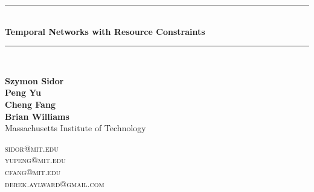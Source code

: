\documentclass{article}
\newcommand{\HRule}{\rule{\linewidth}{0.5mm}}
\begin{document}
\thispagestyle{empty}

\begin{center}
\HRule \\[0.3cm]
{\Large \bfseries
Temporal Networks with Resource Constraints\\[0.3cm]}
\HRule \\[0.5cm]

\noindent
\begin{minipage}{0.5\textwidth}
\begin{flushleft}
\textbf{Szymon Sidor\\
Peng Yu\\
Cheng Fang\\
Brian Williams}\\
Massachusetts Institute of Technology
\end{flushleft}
\end{minipage}%
\begin{minipage}{0.5\textwidth}
\begin{flushright}
\textsc{sidor@mit.edu}\\
\textsc{yupeng@mit.edu}\\
\textsc{cfang@mit.edu}\\
\textsc{derek.aylward@gmail.com}\\
$\ $
\end{flushright}
\end{minipage}
\\[1cm]
\end{center}
\pagestyle{fancy}
\end{document}
